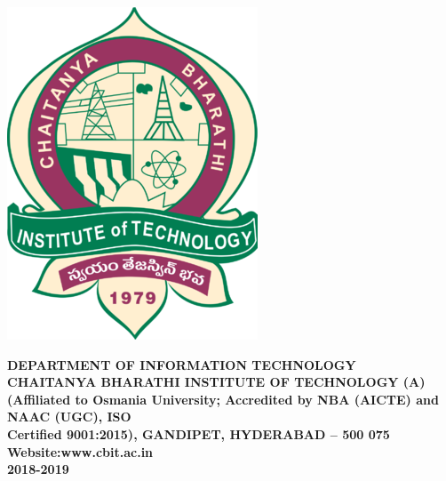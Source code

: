 \begin{titlepage}


\includegraphics [width=40 mm]{cbit.png}\\
\vspace{0.35in}

\textsc{\Large \bfseries DEPARTMENT OF INFORMATION TECHNOLOGY}\\[0.5mm]
\textsc{\Large \bfseries CHAITANYA BHARATHI INSTITUTE OF TECHNOLOGY (A)}\\[0.5mm]
\large \bfseries{(Affiliated to Osmania University; Accredited by NBA (AICTE) and NAAC (UGC), ISO}\\
\large\bfseries{Certified 9001:2015), GANDIPET, HYDERABAD – 500 075}\\
Website:www.cbit.ac.in\\
2018-2019
\vfill

\end{titlepage}